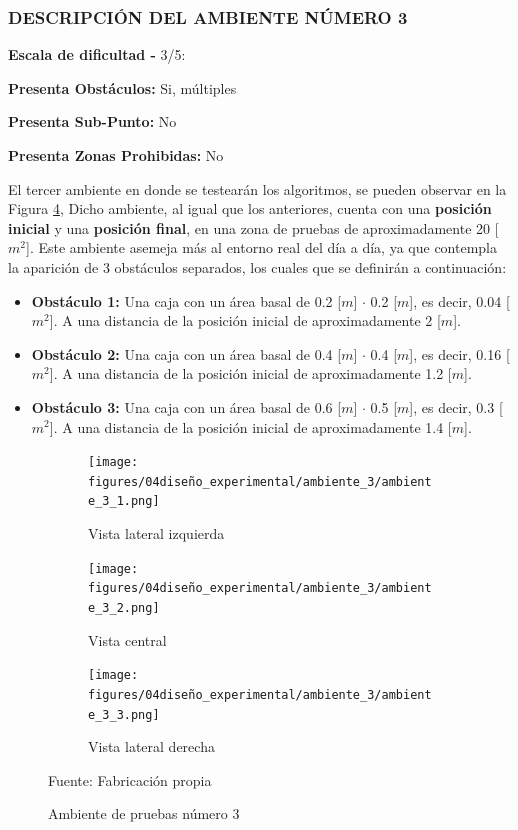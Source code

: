 \newpage
\subsubsection{DESCRIPCIÓN DEL AMBIENTE NÚMERO 3}
\textbf{Escala de dificultad -} 3/5:

\hspace{5mm} \textbf{Presenta Obstáculos:} Si, múltiples

\hspace{5mm} \textbf{Presenta Sub-Punto:} No

\hspace{5mm} \textbf{Presenta Zonas Prohibidas:} No

El tercer ambiente en donde se testearán los algoritmos, se pueden observar en la Figura \ref{fig:ambiente_3}, Dicho ambiente, al igual que los anteriores, cuenta con una \textbf{posición inicial} y una \textbf{posición final}, en una zona de pruebas de aproximadamente 20 [$m^{2}$]. Este ambiente asemeja más al entorno real del día a día, ya que contempla la aparición de 3 obstáculos separados, los cuales que se definirán a continuación:

\begin{itemize}
    \item \textbf{Obstáculo 1:} Una caja con un área basal de 0.2 [$m$] $\cdot$ 0.2 [$m$], es decir, 0.04 [$m^{2}$]. A una distancia de la posición inicial de aproximadamente 2 [$m$].
    \item \textbf{Obstáculo 2:} Una caja con un área basal de 0.4 [$m$] $\cdot$ 0.4 [$m$], es decir, 0.16 [$m^{2}$]. A una distancia de la posición inicial de aproximadamente 1.2 [$m$].
    \item \textbf{Obstáculo 3:} Una caja con un área basal de 0.6 [$m$] $\cdot$ 0.5 [$m$], es decir, 0.3 [$m^{2}$]. A una distancia de la posición inicial de aproximadamente 1.4 [$m$].
\end{itemize} 

\begin{figure}[H]
    \centering
    \begin{subfigure}[b]{0.30\textwidth}
    \texttt{[image: figures/04diseño\_experimental/ambiente\_3/ambiente\_3\_1.png]}
    \caption{Vista lateral izquierda}
    \label{fig:ambiente_3_1}
    \end{subfigure}
    \begin{subfigure}[b]{0.30\textwidth}
    \texttt{[image: figures/04diseño\_experimental/ambiente\_3/ambiente\_3\_2.png]}
    \caption{Vista central}
    \label{fig:ambiente_3_2}
    \end{subfigure}
    \begin{subfigure}[b]{0.30\textwidth}
    \texttt{[image: figures/04diseño\_experimental/ambiente\_3/ambiente\_3\_3.png]}
    \caption{Vista lateral derecha}
    \label{fig:ambiente_3_3}
    \end{subfigure}
    \caption{Ambiente de pruebas número 3 }
    Fuente: Fabricación propia
    \label{fig:ambiente_3}
\end{figure}

